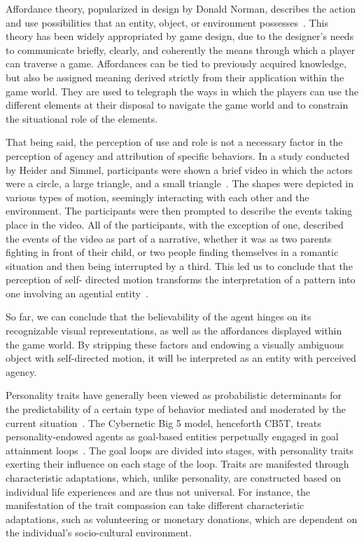 Affordance theory, popularized in design by Donald Norman, describes the action and use possibilities that an entity, object, or environment possesses~. This theory has been widely appropriated by game design, due to the designer’s needs to communicate briefly, clearly, and coherently the means through which a player can traverse a game. Affordances can be tied to previously acquired knowledge, but also be assigned meaning derived strictly from their application within the game world. They are used to telegraph the ways in which the players can use the different elements at their disposal to navigate the game world and to constrain the situational role of the elements.

That being said, the perception of use and role is not a necessary factor in the perception of agency and attribution of specific behaviors. In a study conducted by Heider and Simmel, participants were shown a brief video in which the actors were a circle, a large triangle, and a small triangle~. The shapes were depicted in various types of motion, seemingly interacting with each other and the environment. The participants were then prompted to describe the events taking place in the video. All of the participants, with the exception of one, described the events of the video as part of a narrative, whether it was as two parents fighting in front of their child, or two people finding themselves in a romantic situation and then being interrupted by a third. This led us to conclude that the perception of self- directed motion transforms the interpretation of a pattern into one involving an agential entity~.

So far, we can conclude that the believability of the agent hinges on its recognizable visual representations, as well as the affordances displayed within the game world. By stripping these factors and endowing a visually ambiguous object with self-directed motion, it will be interpreted as an entity with perceived agency.

Personality traits have generally been viewed as probabilistic determinants for the predictability of a certain type of behavior mediated and moderated by  the current situation~. The Cybernetic Big 5 model, henceforth CB5T, treats personality-endowed agents as goal-based entities perpetually engaged in goal attainment loops~. The goal loops are divided into stages, with personality traits exerting their influence on each stage of the loop. Traits are manifested through characteristic adaptations, which, unlike personality, are constructed based on individual life experiences and are thus not universal. For instance, the manifestation of the trait compassion can take different characteristic adaptations, such as volunteering or monetary donations, which are dependent on the individual’s socio-cultural environment.

